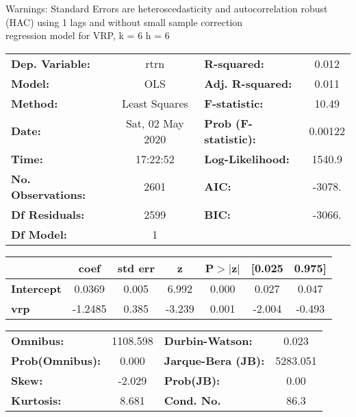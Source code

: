Warnings: \newline
 [1] Standard Errors are heteroscedasticity and autocorrelation robust (HAC) using 1 lags and without small sample correction\\ 

regression model for VRP, k = 6 h = 6\begin{center}
\begin{tabular}{lclc}
\toprule
\textbf{Dep. Variable:}    &       rtrn       & \textbf{  R-squared:         } &     0.012   \\
\textbf{Model:}            &       OLS        & \textbf{  Adj. R-squared:    } &     0.011   \\
\textbf{Method:}           &  Least Squares   & \textbf{  F-statistic:       } &     10.49   \\
\textbf{Date:}             & Sat, 02 May 2020 & \textbf{  Prob (F-statistic):} &  0.00122    \\
\textbf{Time:}             &     17:22:52     & \textbf{  Log-Likelihood:    } &    1540.9   \\
\textbf{No. Observations:} &        2601      & \textbf{  AIC:               } &    -3078.   \\
\textbf{Df Residuals:}     &        2599      & \textbf{  BIC:               } &    -3066.   \\
\textbf{Df Model:}         &           1      & \textbf{                     } &             \\
\bottomrule
\end{tabular}
\begin{tabular}{lcccccc}
                   & \textbf{coef} & \textbf{std err} & \textbf{z} & \textbf{P$> |$z$|$} & \textbf{[0.025} & \textbf{0.975]}  \\
\midrule
\textbf{Intercept} &       0.0369  &        0.005     &     6.992  &         0.000        &        0.027    &        0.047     \\
\textbf{vrp}       &      -1.2485  &        0.385     &    -3.239  &         0.001        &       -2.004    &       -0.493     \\
\bottomrule
\end{tabular}
\begin{tabular}{lclc}
\textbf{Omnibus:}       & 1108.598 & \textbf{  Durbin-Watson:     } &    0.023  \\
\textbf{Prob(Omnibus):} &   0.000  & \textbf{  Jarque-Bera (JB):  } & 5283.051  \\
\textbf{Skew:}          &  -2.029  & \textbf{  Prob(JB):          } &     0.00  \\
\textbf{Kurtosis:}      &   8.681  & \textbf{  Cond. No.          } &     86.3  \\
\bottomrule
\end{tabular}
\end{center}

